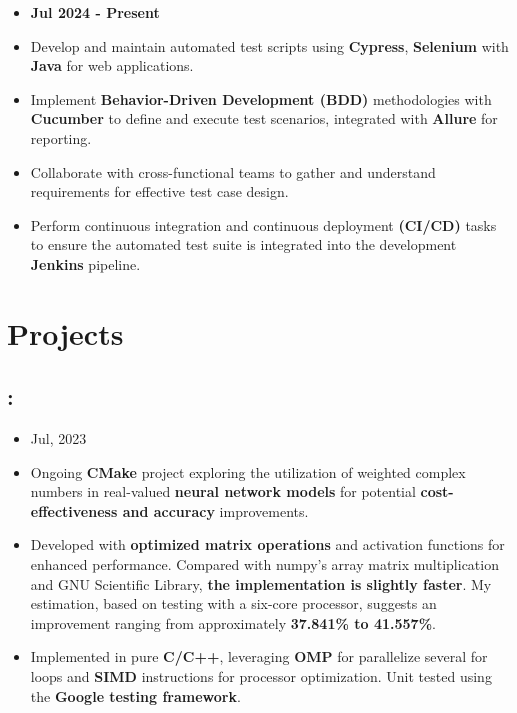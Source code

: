 \message{ !name(MyResume.tex)}\documentclass[11pt]{article}
\begin{document}
\begin{itemize}[noitemsep, nolistsep]
\item \textbf{Jul 2024 - Present}
\item Develop and maintain automated test scripts using \textbf{Cypress}, \textbf{Selenium} with \textbf{Java} for web applications.
\item Implement \textbf{Behavior-Driven Development (BDD)} methodologies with \textbf{Cucumber} to define
  and execute test scenarios, integrated with \textbf{Allure} for reporting.
\item Collaborate with cross-functional teams to gather and understand requirements for effective test case
  design.
\item Perform continuous integration and continuous deployment \textbf{(CI/CD)} tasks to ensure
  the automated test suite is integrated into the development \textbf{Jenkins} pipeline.
\end{itemize}
\vspace{-0.4cm}

\section*{Projects}
\vspace{-0.4cm}
\titlerule[0.3pt]
\vspace{0.1cm}


\subsection*{\href{https://github.com/alecksandr26/cnet}{\color{blue}{Complex Neural Networks Framework From Scratch}}:}
\vspace{-0.3cm}
\begin{itemize}[noitemsep, nolistsep]
\item Jul, 2023
\item Ongoing \textbf{CMake} project exploring the utilization of weighted complex numbers in real-valued
  \textbf{neural network models} for potential \textbf{cost-effectiveness and accuracy} improvements.
\item Developed with \textbf{optimized matrix operations} and activation functions for enhanced performance.
  Compared with numpy's array matrix multiplication and GNU Scientific Library,
  \textbf{the implementation is slightly faster}.
  My estimation, based on testing with a six-core processor, suggests an improvement ranging from
  approximately \textbf{37.841\% to 41.557\%}.
\item Implemented in pure \textbf{C/C++}, leveraging \textbf{OMP} for parallelize several for loops
  and \textbf{SIMD} instructions for processor optimization. Unit tested using the
  \textbf{Google testing framework}.
\end{itemize}
\vspace{-0.3cm}
\end{document}
